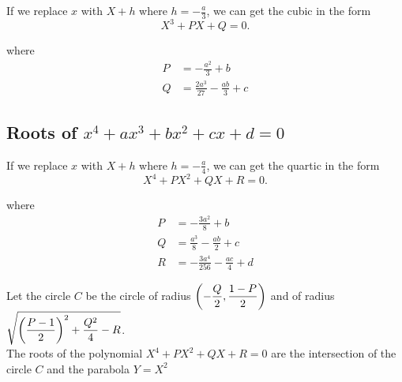 \documentclass{report}
\begin{document}
If we replace $x$ with $X+h$ where $h = -\frac{a}{3}$, we can get the cubic in the form
\[
	X^3 + PX + Q = 0
	.\]

where
\begin{align*}
	P & = -\frac{a^2}{3}+b                 \\
	Q & = \frac{2a^3}{27} - \frac{ab}{3}+c
\end{align*}

\subsection{Roots of $x^4+ax^3+bx^2+cx+d=0$}

If we replace $x$ with $X+h$ where $h = -\frac{a}{4}$, we can get the quartic in the form
\[
	X^4 + PX^2 + QX + R = 0
	.\]

where
\begin{align*}
	P & = -\frac{3a^2}{8}+b                   \\
	Q & = \frac{a^3}{8} -\frac{ab}{2} + c     \\
	R & = -\frac{3a^4}{256} -\frac{ac}{4} + d
\end{align*}

Let the circle $C$ be the circle of radius $\displaystyle\left(-\frac{Q}{2},\frac{1-P}{2}\right)$ and of radius $\displaystyle\sqrt{\left(\frac{P-1}{2}\right)^2 + \frac{Q^2}{4} - R}$.\\

The roots of the polynomial $X^4 + PX^2 + QX + R = 0$ are the intersection of the circle $C$ and the parabola $Y=X^2$
\end{document}
